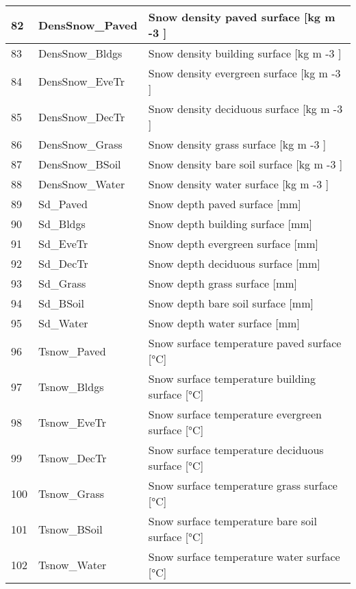 \documentclass[letterpaper,10pt,english]{sphinxmanual}
\begin{document}
\begin{savenotes}
\begin{longtable}{|l|l|l|}
\\
\hline
82
&
DensSnow\_Paved
&
Snow density \textendash{} paved surface {[}kg m -3 {]}
\\
\hline
83
&
DensSnow\_Bldgs
&
Snow density \textendash{} building surface {[}kg m -3 {]}
\\
\hline
84
&
DensSnow\_EveTr
&
Snow density \textendash{} evergreen surface {[}kg m -3 {]}
\\
\hline
85
&
DensSnow\_DecTr
&
Snow density \textendash{} deciduous surface {[}kg m -3 {]}
\\
\hline
86
&
DensSnow\_Grass
&
Snow density \textendash{} grass surface {[}kg m -3 {]}
\\
\hline
87
&
DensSnow\_BSoil
&
Snow density \textendash{} bare soil surface {[}kg m -3 {]}
\\
\hline
88
&
DensSnow\_Water
&
Snow density \textendash{} water surface {[}kg m -3 {]}
\\
\hline
89
&
Sd\_Paved
&
Snow depth \textendash{} paved surface {[}mm{]}
\\
\hline
90
&
Sd\_Bldgs
&
Snow depth \textendash{} building surface {[}mm{]}
\\
\hline
91
&
Sd\_EveTr
&
Snow depth \textendash{} evergreen surface {[}mm{]}
\\
\hline
92
&
Sd\_DecTr
&
Snow depth \textendash{} deciduous surface {[}mm{]}
\\
\hline
93
&
Sd\_Grass
&
Snow depth \textendash{} grass surface {[}mm{]}
\\
\hline
94
&
Sd\_BSoil
&
Snow depth \textendash{} bare soil surface {[}mm{]}
\\
\hline
95
&
Sd\_Water
&
Snow depth \textendash{} water surface {[}mm{]}
\\
\hline
96
&
Tsnow\_Paved
&
Snow surface temperature \textendash{} paved surface {[}°C{]}
\\
\hline
97
&
Tsnow\_Bldgs
&
Snow surface temperature \textendash{} building surface {[}°C{]}
\\
\hline
98
&
Tsnow\_EveTr
&
Snow surface temperature \textendash{} evergreen surface {[}°C{]}
\\
\hline
99
&
Tsnow\_DecTr
&
Snow surface temperature \textendash{} deciduous surface {[}°C{]}
\\
\hline
100
&
Tsnow\_Grass
&
Snow surface temperature \textendash{} grass surface {[}°C{]}
\\
\hline
101
&
Tsnow\_BSoil
&
Snow surface temperature \textendash{} bare soil surface {[}°C{]}
\\
\hline
102
&
Tsnow\_Water
&
Snow surface temperature \textendash{} water surface {[}°C{]}
\\
\hline
\end{longtable}\sphinxatlongtableend\end{savenotes}
\end{document}
